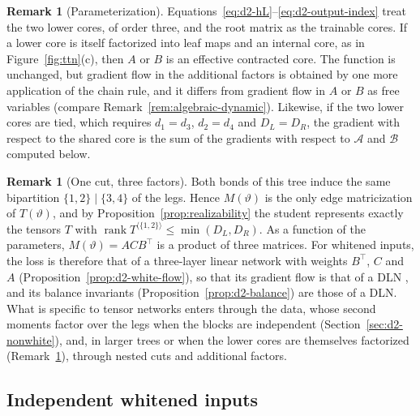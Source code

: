 \documentclass[11pt]{article}
\newcommand{\rank}{\operatorname{rank}}
\theoremstyle{definition}
\newtheorem{remark}[theorem]{Remark}
\numberwithin{equation}{section}
\begin{document}
\begin{remark}[Parameterization]\label{rem:d2-parameterization}
Equations~\eqref{eq:d2-hL}--\eqref{eq:d2-output-index} treat the two lower cores, of order three, and the root matrix as the trainable cores. If a lower core is itself factorized into leaf maps and an internal core, as in Figure~\ref{fig:ttn}(c), then $A$ or $B$ is an effective contracted core. The function is unchanged, but gradient flow in the additional factors is obtained by one more application of the chain rule, and it differs from gradient flow in $A$ or $B$ as free variables (compare Remark~\ref{rem:algebraic-dynamic}). Likewise, if the two lower cores are tied, which requires $d_1=d_3$, $d_2=d_4$ and $D_L=D_R$, the gradient with respect to the shared core is the sum of the gradients with respect to $\mathcal A$ and $\mathcal B$ computed below.
\end{remark}

\begin{remark}[One cut, three factors]\label{rem:d2-one-cut}
Both bonds of this tree induce the same bipartition $\{1,2\}\mid\{3,4\}$ of the legs. Hence $M(\vartheta)$ is the only edge matricization of $T(\vartheta)$, and by Proposition~\ref{prop:realizability} the student represents exactly the tensors $T$ with $\rank T^{\langle\{1,2\}\rangle}\le\min(D_L,D_R)$. As a function of the parameters, $M(\vartheta)=ACB^\top$ is a product of three matrices. For whitened inputs, the loss is therefore that of a three-layer linear network with weights $B^\top$, $C$ and $A$ (Proposition~\ref{prop:d2-white-flow}), so that its gradient flow is that of a DLN \citep{saxe2014exact}, and its balance invariants (Proposition~\ref{prop:d2-balance}) are those of a DLN. What is specific to tensor networks enters through the data, whose second moments factor over the legs when the blocks are independent (Section~\ref{sec:d2-nonwhite}), and, in larger trees or when the lower cores are themselves factorized (Remark~\ref{rem:d2-parameterization}), through nested cuts and additional factors.
\end{remark}

\subsection{Independent whitened inputs}\label{sec:d2-white}
\end{document}
